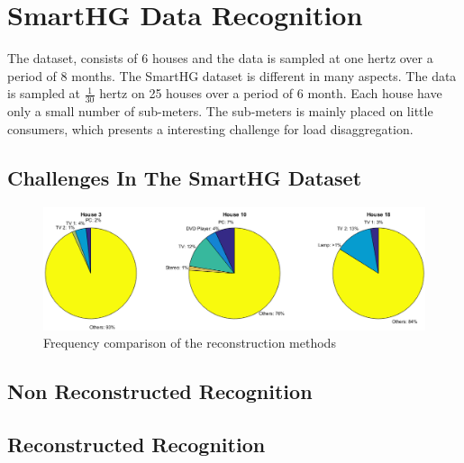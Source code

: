 \chapter{SmartHG Data Recognition} 
The  dataset, consists of 6 houses and the data is sampled at one hertz over a period  of 8 months. The SmartHG dataset is different in many aspects. The data is sampled at $\frac{1}{30}$ hertz on 25 houses over a period of 6 month. Each house have only a small number of sub-meters. The sub-meters is mainly placed on little consumers, which presents a interesting challenge for load disaggregation. 

\section{Challenges In The SmartHG Dataset} 

\begin{figure}[H]
\centering
\includegraphics[width=1\textwidth]{billeder/TotalPie.png}
\caption{Frequency comparison of the reconstruction methods}
\label{fig:RecFeq}
\end{figure}


\section{Non Reconstructed Recognition }
\section{Reconstructed Recognition }